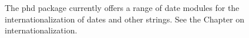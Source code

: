 The phd package currently offers a range of date modules for the internationalization of dates and other strings. See the Chapter on internationalization.
























































